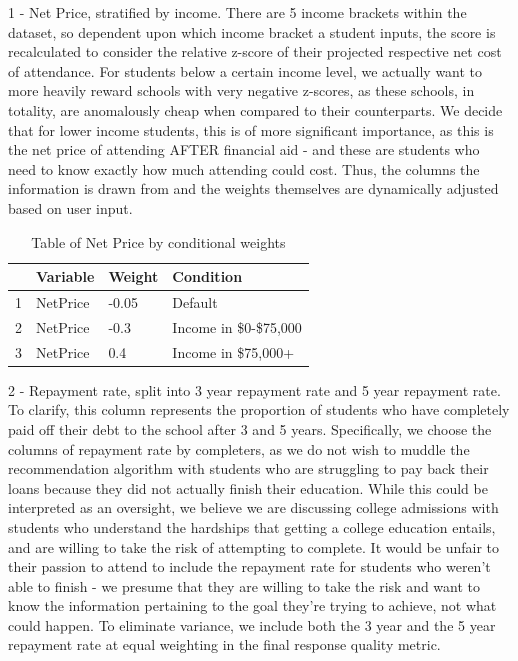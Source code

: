 \documentclass{article}\usepackage[]{graphicx}\usepackage[]{color}
\begin{document}
1 - Net Price, stratified by income. There are 5 income brackets within the dataset, so dependent upon which income bracket a student inputs, the score is recalculated to consider the relative z-score of their projected respective net cost of attendance. For students below a certain income level, we actually want to more heavily reward schools with very negative z-scores, as these schools, in totality, are anomalously cheap when compared to their counterparts. We decide that for lower income students, this is of more significant importance, as this is the net price of attending AFTER financial aid - and these are students who need to know exactly how much attending could cost. Thus, the columns the information is drawn from and the weights themselves are dynamically adjusted based on user input.

\begin{table}[ht]
\centering
\begin{tabular}{rlll}
  \hline
 & Variable & Weight & Condition \\ 
  \hline
1 & NetPrice & -0.05 & Default \\ 
  2 & NetPrice & -0.3 & Income in \$0-\$75,000 \\ 
  3 & NetPrice & 0.4 & Income in \$75,000+ \\ 
   \hline
\end{tabular}
\caption{Table of Net Price by conditional weights} 
\end{table}


2 - Repayment rate, split into 3 year repayment rate and 5 year repayment rate. To clarify, this column represents the proportion of students who have completely paid off their debt to the school after 3 and 5 years.  Specifically, we choose the columns of repayment rate by completers, as we do not wish to muddle the recommendation algorithm with students who are struggling to pay back their loans because they did not actually finish their education. While this could be interpreted as an oversight, we believe we are discussing college admissions with students who understand the hardships that getting a college education entails, and are willing to take the risk of attempting to complete. It would be unfair to their passion to attend to include the repayment rate for students who weren't able to finish - we presume that they are willing to take the risk and want to know the information pertaining to the goal they're trying to achieve, not what could happen. To eliminate variance, we include both the 3 year and the 5 year repayment rate at equal weighting in the final response quality metric.
\end{document}
